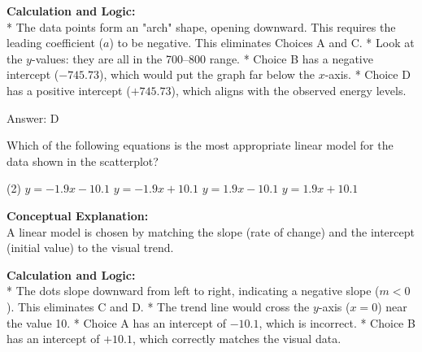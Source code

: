\documentclass[11pt,paper=a4,answers]{exam}
\begin{document}
\begin{questions}
\begin{solution}
\vspace{30pt}

\textbf{Calculation and Logic:} \\
* The data points form an "arch" shape, opening downward. This requires the leading coefficient ($a$) to be negative. This eliminates Choices A and C.
* Look at the $y$-values: they are all in the 700--800 range.
* Choice B has a negative intercept ($-745.73$), which would put the graph far below the $x$-axis.
* Choice D has a positive intercept ($+745.73$), which aligns with the observed energy levels.

\vspace{30pt}

Answer: \colorbox{yellow!100}{D}
\end{solution}

\vspace{60pt}

\question
\begin{center}
\end{center}
Which of the following equations is the most appropriate linear model for the data shown in the scatterplot?
\begin{tasks}(2)
    \task $y = -1.9x - 10.1$
    \task $y = -1.9x + 10.1$
    \task $y = 1.9x - 10.1$
    \task $y = 1.9x + 10.1$
\end{tasks}

\begin{solution}
\textbf{Conceptual Explanation:} \\
A linear model is chosen by matching the slope (rate of change) and the intercept (initial value) to the visual trend.

\vspace{30pt}

\textbf{Calculation and Logic:} \\
* The dots slope downward from left to right, indicating a negative slope ($m < 0$). This eliminates C and D.
* The trend line would cross the $y$-axis ($x=0$) near the value 10.
* Choice A has an intercept of $-10.1$, which is incorrect.
* Choice B has an intercept of $+10.1$, which correctly matches the visual data.


\end{solution}
\end{questions}
\end{document}
